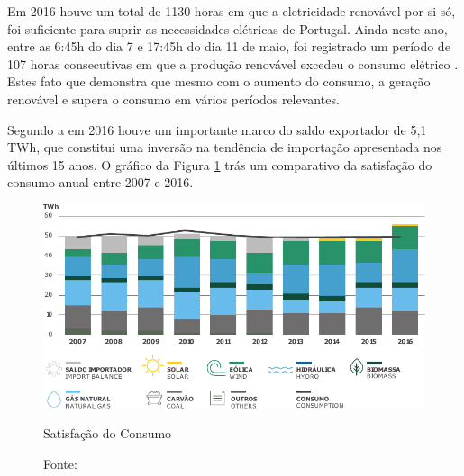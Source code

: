 Em 2016 houve um total de  1130 horas em que a eletricidade renovável por si só, foi suficiente para suprir as necessidades elétricas de Portugal. Ainda neste ano, entre as 6:45h do dia 7 e 17:45h do dia 11 de maio, foi registrado um período de 107 horas consecutivas em que a produção renovável excedeu o consumo elétrico \cite{apren}. Estes fato que demonstra que mesmo com o aumento do consumo, a geração renovável e supera o consumo em vários períodos relevantes. 

Segundo a  em 2016 houve um importante marco do saldo exportador de 5,1 TWh, que constitui uma inversão na tendência de importação apresentada nos últimos 15 anos. O gráfico da Figura \ref{fig:SatisfacaoDoConsumo} trás um comparativo da satisfação do consumo anual entre 2007 e 2016. 

\vspace{5.5mm}

\begin{figure}[H]
	\centering
	\captionsetup{width=0.7\textwidth, font=footnotesize, textfont=bf}	
	\includegraphics[width=0.7\linewidth]{img/SatisfacaoDoConsumo.pdf}
	\caption{Satisfação do Consumo}
	\vspace{-3.5mm}
	\caption*{Fonte: }
	\label{fig:SatisfacaoDoConsumo}
\end{figure}